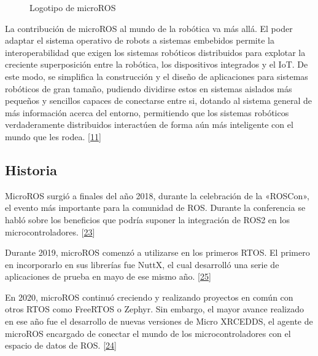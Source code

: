 \documentclass[a4paper,11pt,spanish]{sphinxmanual}
\let\sphinxpxdimen\pdfpxdimen\else\newdimen\sphinxpxdimen
\begin{document}
\begin{figure}[htbp]
\centering
\capstart

\noindent\sphinxincludegraphics[width=200\sphinxpxdimen]{{micro_ros}.jpeg}
\caption{Logotipo de micro\sphinxhyphen{}ROS}\label{\detokenize{marco_teorico_y_estado_del_arte:id62}}\end{figure}

\sphinxAtStartPar
La contribución de micro\sphinxhyphen{}ROS al mundo de la robótica va más allá. El
poder adaptar el sistema operativo de robots a sistemas embebidos
permite la interoperabilidad que exigen los sistemas robóticos
distribuidos para explotar la creciente superposición entre la robótica,
los dispositivos integrados y el IoT. De este modo, se simplifica la
construcción y el diseño de aplicaciones para sistemas robóticos de gran
tamaño, pudiendo dividirse estos en sistemas aislados más pequeños y
sencillos capaces de conectarse entre si, dotando al sistema general de
más información acerca del entorno, permitiendo que los sistemas
robóticos verdaderamente distribuidos interactúen de forma aún más
inteligente con el mundo que les rodea. {[}\hyperlink{cite.marco_teorico_y_estado_del_arte:id17}{11}{]}


\subsection{Historia}
\label{\detokenize{marco_teorico_y_estado_del_arte:id51}}
\sphinxAtStartPar
Micro\sphinxhyphen{}ROS surgió a finales del año 2018, durante la celebración de
la «ROSCon», el evento más importante para la comunidad de ROS. Durante la conferencia
se habló sobre los beneficios que podría suponer la integración de ROS2 en los
microcontroladores. {[}\hyperlink{cite.marco_teorico_y_estado_del_arte:id42}{23}{]}

\sphinxAtStartPar
Durante 2019, micro\sphinxhyphen{}ROS comenzó a utilizarse en los primeros RTOS. El primero
en incorporarlo en sus librerías fue NuttX, el cual desarrolló una serie de
aplicaciones de prueba en mayo de ese mismo año. {[}\hyperlink{cite.marco_teorico_y_estado_del_arte:id44}{25}{]}

\sphinxAtStartPar
En 2020, micro\sphinxhyphen{}ROS continuó creciendo y realizando proyectos en común con
otros RTOS como FreeRTOS o Zephyr. Sin embargo, el mayor avance realizado
en ese año fue el desarrollo de nuevas versiones de Micro XRCE\sphinxhyphen{}DDS, el agente de
micro\sphinxhyphen{}ROS encargado de conectar el mundo de los microcontroladores con el espacio
de datos de ROS. {[}\hyperlink{cite.marco_teorico_y_estado_del_arte:id45}{24}{]}
\end{document}

